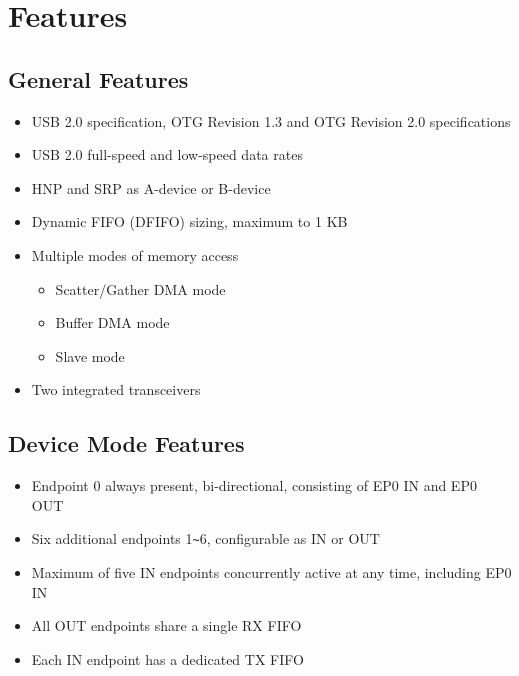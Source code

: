 \documentclass[main\_\_EN.tex]{subfiles}
\begin{document}
\section{Features}

\subsection{General Features}
\begin{itemize}
    \item USB 2.0 specification, OTG Revision 1.3 and OTG Revision 2.0 specifications
    \item USB 2.0 full-speed and low-speed data rates
    \item HNP and SRP as A-device or B-device
    \item Dynamic FIFO (DFIFO) sizing, maximum to 1 KB
    \item Multiple modes of memory access
    \begin{itemize}
        \item Scatter/Gather DMA mode
        \item Buffer DMA mode
        \item Slave mode
    \end{itemize}
    \item Two integrated transceivers
\end{itemize}

\subsection{Device Mode Features}

\begin{itemize}
    \item Endpoint 0 always present, bi-directional, consisting of EP0 IN and EP0 OUT
    \item Six additional endpoints 1\verb+~+6, configurable as IN or OUT
    \item Maximum of five IN endpoints concurrently active at any time, including EP0 IN
    \item All OUT endpoints share a single RX FIFO
    \item Each IN endpoint has a dedicated TX FIFO
\end{itemize}
\end{document}
